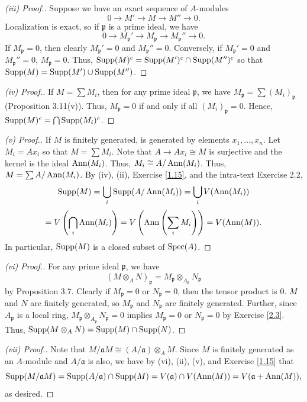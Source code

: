 \begin{proof}[(iii) Proof.]
Suppose we have an exact sequence of $A$-modules
$$0 \to M' \to M \to M'' \to 0.$$
Localization is exact, so if $\mathfrak{p}$ is a prime ideal, we have
$$0 \to M_{\mathfrak{p}}' \to M_{\mathfrak{p}} \to M_{\mathfrak{p}}'' \to 0.$$
If $M_{\mathfrak{p}} = 0$, then clearly $M_{\mathfrak{p}}' = 0$ and $M_{\mathfrak{p}}'' = 0$. Conversely, if $M_{\mathfrak{p}}' = 0$ and $M_{\mathfrak{p}}'' = 0$,
$M_{\mathfrak{p}} = 0$. Thus, $\operatorname{Supp}(M)^c = \operatorname{Supp}(M')^c \cap \operatorname{Supp}(M'')^c$ so that $\operatorname{Supp}(M) = \operatorname{Supp}(M') \cup \operatorname{Supp}(M'')$.
\end{proof}

\begin{proof}[(iv) Proof.]
If $M = \sum M_i$, then for any prime ideal $\mathfrak{p}$, we have $M_{\mathfrak{p}} = \sum (M_i)_{\mathfrak{p}}$ (Proposition 3.11(v)). Thus, $M_{\mathfrak{p}} = 0$ if and only if all $(M_i)_{\mathfrak{p}} = 0$.
Hence, $\operatorname{Supp}(M)^c = \bigcap\operatorname{Supp}(M_i)^c$.
\end{proof}

\begin{proof}[(v) Proof.]
If $M$ is finitely generated, is generated by elements $x_1,\ldots,x_n$. Let $M_i = Ax_i$ so that $M = \sum M_i$. Note that $A \to Ax_i \cong M$ is surjective and the kernel is the ideal $\operatorname{Ann}(M_i)$. Thus,
$M_i \cong A/\operatorname{Ann}(M_i)$. Thus, $M = \sum A/\operatorname{Ann}(M_i)$. By (iv), (ii), Exercise \ref{1.15}, and the intra-text Exercise 2.2,
$$\operatorname{Supp}(M) = \bigcup_i \operatorname{Supp}(A/\operatorname{Ann}(M_i)) = \bigcup_i V(\operatorname{Ann}(M_i))$$ 
$$= V\left(\bigcap_i \operatorname{Ann}(M_i)\right) = V\left(\operatorname{Ann}\left(\sum_i M_i\right)\right) = V(\operatorname{Ann}(M)).$$
In particular, $\operatorname{Supp}(M)$ is a closed subset of $\operatorname{Spec}(A)$.
\end{proof}

\begin{proof}[(vi) Proof.]
For any prime ideal $\mathfrak{p}$, we have
$$(M \otimes_A N)_{\mathfrak{p}} = M_{\mathfrak{p}} \otimes_{A_{\mathfrak{p}}} N_{\mathfrak{p}}$$
by Proposition 3.7. Clearly if $M_{\mathfrak{p}} = 0$ or $N_{\mathfrak{p}} = 0$, then the tensor product is $0$. $M$ and $N$ are finitely generated, so $M_{\mathfrak{p}}$ and $N_{\mathfrak{p}}$ are
finitely generated. Further, since $A_\mathfrak{p}$ is a local ring, $M_{\mathfrak{p}} \otimes_{A_{\mathfrak{p}}} N_{\mathfrak{p}} = 0$ implies $M_{\mathfrak{p}} = 0$ or $N_{\mathfrak{p}} = 0$
by Exercise \ref{2.3}. Thus, $\operatorname{Supp}(M \otimes_A N) = \operatorname{Supp}(M) \cap \operatorname{Supp}(N)$.
\end{proof}

\begin{proof}[(vii) Proof.]
Note that $M/\mathfrak{a}M \cong (A/\mathfrak{a}) \otimes_A M$. Since $M$ is finitely generated as an $A$-module and $A/\mathfrak{a}$ is also, we have by (vi), (ii), (v), and Exercise \ref{1.15} that
$$\operatorname{Supp}(M/\mathfrak{a}M) = \operatorname{Supp}(A/\mathfrak{a}) \cap \operatorname{Supp}(M) = V(\mathfrak{a}) \cap V(\operatorname{Ann}(M)) = V(\mathfrak{a} + \operatorname{Ann}(M)),$$
as desired.
\end{proof}


